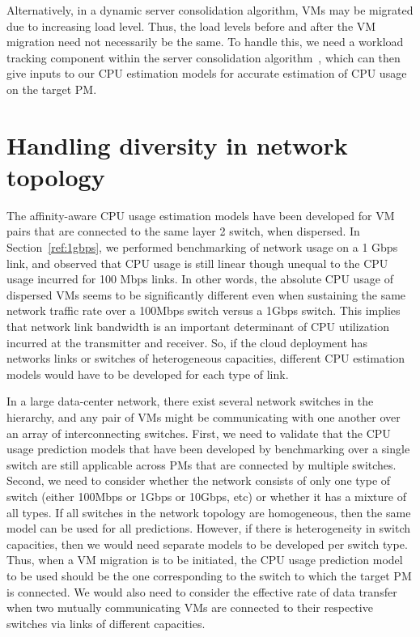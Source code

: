 Alternatively, in a dynamic server
consolidation algorithm, VMs may be migrated due to increasing load level.
Thus, the load levels before and after the VM migration need not
necessarily be the same. To handle this, we need a workload
tracking component within the server consolidation algorithm~\cite{sandpiper},
which can then give inputs to our CPU estimation models for
accurate estimation of CPU usage on the target PM.


\section{Handling diversity in network topology}
The affinity-aware CPU usage estimation models have been developed for
VM pairs that are connected to the same layer 2 switch, when dispersed.
In Section~\ref{ref:1gbps}, we performed benchmarking of network usage
on a 1 Gbps link, and observed that CPU usage is still linear though
unequal to the CPU usage incurred for 100 Mbps links. 
In other words, the absolute CPU usage of dispersed VMs seems to
be significantly different even when sustaining the same network traffic
rate over a 100Mbps switch versus a 1Gbps switch. 
This implies that network link bandwidth is an important
determinant of CPU utilization incurred at the transmitter and
receiver. So, if the cloud deployment has networks links or switches
of heterogeneous capacities,
different CPU estimation models would have to be
developed for each type of link.

In a large data-center
network, there exist several network switches in the hierarchy, 
and any pair of VMs might
be communicating with one another over an array of interconnecting
switches. First, we need to validate that the CPU usage prediction
models that have been developed by benchmarking over a single switch 
are still applicable across PMs that are connected by multiple 
switches. Second, we need to consider whether the network 
consists of only one type of switch (either 100Mbps or 1Gbps or 10Gbps, etc)
or whether it has a mixture of all types. If all switches in 
the network topology are homogeneous, then the same model can be
used for all predictions. However, if there is heterogeneity in
switch capacities, then we would need separate models to be
developed per switch type. Thus, when a VM migration is to be
initiated, the CPU usage prediction model to be used should be
the one corresponding to the switch to which the target PM is connected.
We would also need to consider the effective rate of data transfer
when two mutually communicating VMs are connected to their respective
switches via links of different capacities.

